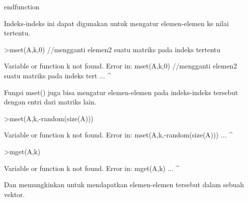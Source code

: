 \documentclass[a4paper,10pt]{article}
\begin{document}
\begin{eulernotebook}
\begin{eulercomment}
\begin{eulercomment}
\begin{eulercomment}
\begin{eulercomment}
\begin{eulercomment}
\begin{eulercomment}
\begin{eulercomment}
\begin{eulercomment}
\begin{eulercomment}
\begin{eulercomment}
\begin{eulercomment}
\begin{eulercomment}
\begin{eulercomment}
\begin{eulercomment}
\begin{eulercomment}
\begin{eulercomment}
\begin{eulerudf}
  endfunction
\end{eulerudf}
\begin{eulercomment}
Indeks-indeks ini dapat digunakan untuk mengatur elemen-elemen ke
nilai tertentu.
\end{eulercomment}
\begin{eulerprompt}
>mset(A,k,0) //mengganti elemen2 suatu matriks pada indeks tertentu
\end{eulerprompt}
\begin{euleroutput}
  Variable or function k not found.
  Error in:
  mset(A,k,0) //mengganti elemen2 suatu matriks pada indeks tert ...
          ^
\end{euleroutput}
\begin{eulercomment}
Fungsi mset() juga bisa mengatur elemen-elemen pada indeks-indeks
tersebut dengan entri dari matriks lain.
\end{eulercomment}
\begin{eulerprompt}
>mset(A,k,-random(size(A)))
\end{eulerprompt}
\begin{euleroutput}
  Variable or function k not found.
  Error in:
  mset(A,k,-random(size(A))) ...
          ^
\end{euleroutput}
\begin{eulerprompt}
>mget(A,k)
\end{eulerprompt}
\begin{euleroutput}
  Variable or function k not found.
  Error in:
  mget(A,k) ...
          ^
\end{euleroutput}
\begin{eulercomment}
Dan memungkinkan untuk mendapatkan elemen-elemen tersebut dalam sebuah
vektor.


\end{eulercomment}
\end{eulercomment}
\end{eulercomment}
\end{eulercomment}
\end{eulercomment}
\end{eulercomment}
\end{eulercomment}
\end{eulercomment}
\end{eulercomment}
\end{eulercomment}
\end{eulercomment}
\end{eulercomment}
\end{eulercomment}
\end{eulercomment}
\end{eulercomment}
\end{eulercomment}
\end{eulercomment}
\end{eulernotebook}
\end{document}
